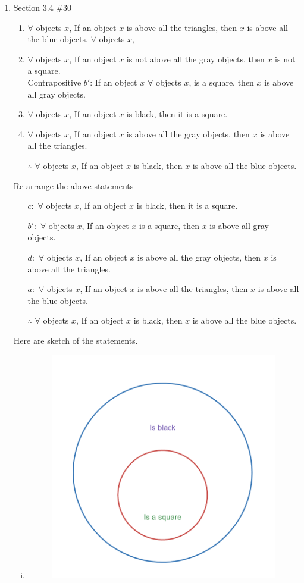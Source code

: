 \documentclass[12pt]{article}
\begin{document}
\begin{enumerate}
        \newpage
        \item Section 3.4 \#30
            \begin{enumerate}[$a:$]
                \item 	$\forall$ objects $x$, If an object $x$ is above all the triangles, then $x$ is above all the blue objects. $\forall$ objects $x$, 
                \item   $\forall$ objects $x$,  If an object $x$ is not above all the gray objects, then $x$ is not a square.\\
                Contrapositive $b'$: If an object $x$ $\forall$ objects $x$, is a square, then $x$ is above all gray objects.
                \item   $\forall$ objects $x$,  If an object $x$ is black, then it is a square.
                \item 	$\forall$ objects $x$,  If an object $x$ is above all the gray objects, then $x$ is above all the triangles.
                \item[$\therefore$] $\forall$ objects $x$,  If an object $x$ is black, then $x$ is above all the blue objects.
            \end{enumerate}
            Re-arrange the above statements
            \begin{enumerate}
                \item[$c:$]  $\forall$ objects $x$,  If an object $x$ is black, then it is a square.
                \item[$b':$] $\forall$ objects $x$,  If an object $x$ is a square, then $x$ is above all gray objects.
                \item[$d:$]  $\forall$ objects $x$,  If an object $x$ is above all the gray objects, then $x$ is above all the triangles.
                \item[$a:$]  $\forall$ objects $x$,  If an object $x$ is above all the triangles, then $x$ is above all the blue objects.
                \item[$\therefore$]  $\forall$ objects $x$,  If an object $x$ is black, then $x$ is above all the blue objects.
            \end{enumerate}
            Here are sketch of the statements.
            \begin{enumerate}[i.]
                \item 
                        \begin{figure}[!h]
                            \centering
                            \includegraphics[width=0.25\linewidth]{Picture Folder//HW02/3.4-30-c.png}

\end{figure}
\end{enumerate}
\end{enumerate}
\end{document}
